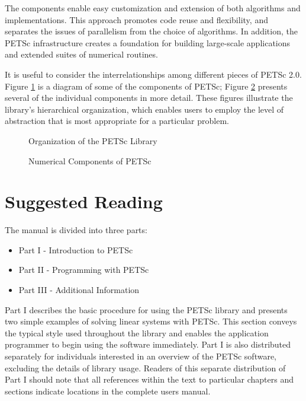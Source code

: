 The components enable easy customization and extension of both algorithms
and implementations.  This approach promotes code reuse and
flexibility, and separates the issues of parallelism from the choice
of algorithms.  In addition, the PETSc infrastructure creates a
foundation for building large-scale applications and extended suites
of numerical routines.

It is useful to consider the interrelationships among different
pieces of PETSc 2.0.  Figure \ref{fig:1} is a diagram of some 
of the components of PETSc; Figure \ref{fig:2} presents
several of the individual components in more detail.
These figures illustrate the library's hierarchical organization,
which enables users to employ the level of abstraction that is most 
appropriate for a particular problem.  
\begin{figure}[hbt]
\centerline{}
\caption{Organization of the PETSc Library}
\label{fig:1}
\end{figure}

\begin{figure}[hbt]
\centerline{}
\caption{Numerical Components of PETSc}
\label{fig:2}
\end{figure}

\section{Suggested Reading}

The manual is
divided into three parts:
\begin{itemize}
\item Part I - Introduction to PETSc
\item Part II - Programming with PETSc
\item Part III - Additional Information
\end{itemize}

Part I describes
the basic procedure for using the PETSc library and presents two
simple examples of solving linear systems with PETSc.  This section
conveys the typical style used throughout the library and enables the
application programmer to begin using the software immediately.
Part I is also distributed separately for individuals interested in an 
overview of the PETSc software, excluding the details of library usage.
Readers of this separate distribution of Part I should note that all
references within the text to particular chapters and sections 
indicate locations in the complete users manual.

